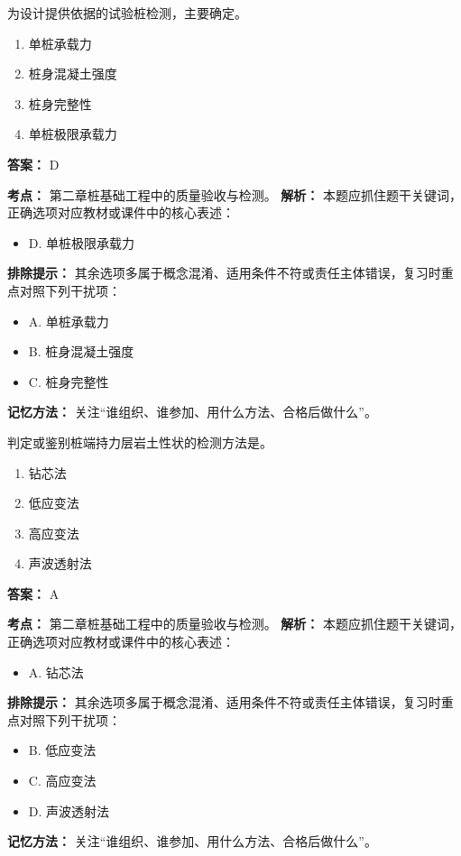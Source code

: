 \documentclass[UTF8,fontset=fandol,11pt]{ctexart}
\begin{document}
\begin{quizbox}[title={第 5 题}]
为设计提供依据的试验桩检测，主要确定。\\
\begin{enumerate}[label=\Alph*.]
\item 单桩承载力
\item 桩身混凝土强度
\item 桩身完整性
\item 单桩极限承载力
\end{enumerate}
\textbf{答案：} D
\vspace{0.25em}
\begin{answerbox}[title={考点解析}]
\textbf{考点：} 第二章桩基础工程中的质量验收与检测。
\textbf{解析：} 本题应抓住题干关键词，正确选项对应教材或课件中的核心表述：
\begin{itemize}
\item D. 单桩极限承载力
\end{itemize}
\textbf{排除提示：} 其余选项多属于概念混淆、适用条件不符或责任主体错误，复习时重点对照下列干扰项：
\begin{itemize}
\item A. 单桩承载力
\item B. 桩身混凝土强度
\item C. 桩身完整性
\end{itemize}
\textbf{记忆方法：} 关注“谁组织、谁参加、用什么方法、合格后做什么”。
\end{answerbox}
\end{quizbox}

\vspace{0.2em}

\begin{quizbox}[title={第 6 题}]
判定或鉴别桩端持力层岩土性状的检测方法是。\\
\begin{enumerate}[label=\Alph*.]
\item 钻芯法
\item 低应变法
\item 高应变法
\item 声波透射法
\end{enumerate}
\textbf{答案：} A
\vspace{0.25em}
\begin{answerbox}[title={考点解析}]
\textbf{考点：} 第二章桩基础工程中的质量验收与检测。
\textbf{解析：} 本题应抓住题干关键词，正确选项对应教材或课件中的核心表述：
\begin{itemize}
\item A. 钻芯法
\end{itemize}
\textbf{排除提示：} 其余选项多属于概念混淆、适用条件不符或责任主体错误，复习时重点对照下列干扰项：
\begin{itemize}
\item B. 低应变法
\item C. 高应变法
\item D. 声波透射法
\end{itemize}
\textbf{记忆方法：} 关注“谁组织、谁参加、用什么方法、合格后做什么”。
\end{answerbox}
\end{quizbox}
\end{document}
